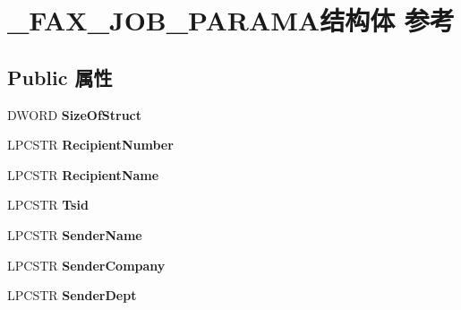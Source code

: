 \hypertarget{struct___f_a_x___j_o_b___p_a_r_a_m_a}{}\section{\+\_\+\+F\+A\+X\+\_\+\+J\+O\+B\+\_\+\+P\+A\+R\+A\+M\+A结构体 参考}
\label{struct___f_a_x___j_o_b___p_a_r_a_m_a}
\subsection*{Public 属性}
\begin{DoxyCompactItemize}
\item 
\mbox{\label{struct___f_a_x___j_o_b___p_a_r_a_m_a_afed6ed452aad280741f6c11fa14abe78}} 
D\+W\+O\+RD {\bfseries Size\+Of\+Struct}
\item 
\mbox{\label{struct___f_a_x___j_o_b___p_a_r_a_m_a_a43cf265ed752c4b31729074ac875d0d0}} 
L\+P\+C\+S\+TR {\bfseries Recipient\+Number}
\item 
\mbox{\label{struct___f_a_x___j_o_b___p_a_r_a_m_a_a01d596a3b6bba5f2f971fc42d231e598}} 
L\+P\+C\+S\+TR {\bfseries Recipient\+Name}
\item 
\mbox{\label{struct___f_a_x___j_o_b___p_a_r_a_m_a_a0f12448430b30486970d259d0c518883}} 
L\+P\+C\+S\+TR {\bfseries Tsid}
\item 
\mbox{\label{struct___f_a_x___j_o_b___p_a_r_a_m_a_a6900dac4a84d64317d4f425ecf06ad49}} 
L\+P\+C\+S\+TR {\bfseries Sender\+Name}
\item 
\mbox{\label{struct___f_a_x___j_o_b___p_a_r_a_m_a_a7078021473ad07ae53e5137ef07c1d5f}} 
L\+P\+C\+S\+TR {\bfseries Sender\+Company}
\item 
\mbox{\label{struct___f_a_x___j_o_b___p_a_r_a_m_a_a3e9b258ab0c276be92265856bf6e5f4b}} 
L\+P\+C\+S\+TR {\bfseries Sender\+Dept}
\item 
\mbox{\label{struct___f_a_x___j_o_b___p_a_r_a_m_a_ab8a73f87c3f6920093cb83d86dafdb83}} 

\end{DoxyCompactItemize}
